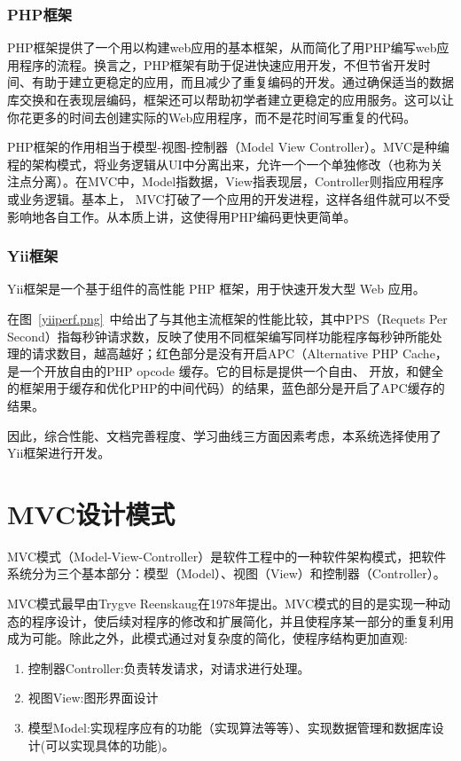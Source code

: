 \subsubsection{PHP框架}

PHP框架提供了一个用以构建web应用的基本框架，从而简化了用PHP编写web应用程序的流程。换言之，PHP框架有助于促进快速应用开发，不但节省开发时间、有助于建立更稳定的应用，而且减少了重复编码的开发。通过确保适当的数据库交换和在表现层编码，框架还可以帮助初学者建立更稳定的应用服务。这可以让你花更多的时间去创建实际的Web应用程序，而不是花时间写重复的代码。

PHP框架的作用相当于模型-视图-控制器（Model View Controller）。MVC是种编程的架构模式，将业务逻辑从UI中分离出来，允许一个一个单独修改（也称为关注点分离）。在MVC中，Model指数据，View指表现层，Controller则指应用程序或业务逻辑。基本上， MVC打破了一个应用的开发进程，这样各组件就可以不受影响地各自工作。从本质上讲，这使得用PHP编码更快更简单。

\subsubsection{Yii框架}

Yii框架是一个基于组件的高性能 PHP 框架，用于快速开发大型 Web 应用。

在图~\ref{yiiperf.png}~中给出了与其他主流框架的性能比较，其中PPS（Requets Per Second）指每秒钟请求数，反映了使用不同框架编写同样功能程序每秒钟所能处理的请求数目，越高越好；红色部分是没有开启APC（Alternative PHP Cache，是一个开放自由的PHP opcode 缓存。它的目标是提供一个自由、 开放，和健全的框架用于缓存和优化PHP的中间代码）的结果，蓝色部分是开启了APC缓存的结果。

因此，综合性能\cite{yiiperf}、文档完善程度\cite{makarov2011yii}、学习曲线三方面因素考虑，本系统选择使用了Yii框架进行开发。


\section{MVC设计模式}
MVC模式（Model-View-Controller）是软件工程中的一种软件架构模式，把软件系统分为三个基本部分：模型（Model）、视图（View）和控制器（Controller）。

MVC模式最早由Trygve Reenskaug在1978年提出。MVC模式的目的是实现一种动态的程序设计，使后续对程序的修改和扩展简化，并且使程序某一部分的重复利用成为可能。除此之外，此模式通过对复杂度的简化，使程序结构更加直观:
\begin{enumerate}
\item 控制器Controller:负责转发请求，对请求进行处理。
\item 视图View:图形界面设计
\item 模型Model:实现程序应有的功能（实现算法等等）、实现数据管理和数据库设计(可以实现具体的功能)。
\end{enumerate}
